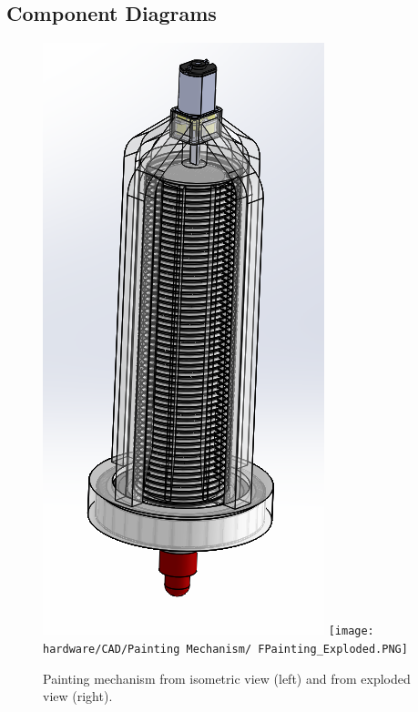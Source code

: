 \subsection{Component Diagrams}
\label{sec:component_diagrams}

\begin{figure}
\centering
\includegraphics[width=0.9\columnwidth]{hardware/CAD/Painting Mechanism/Painting.PNG}
\texttt{[image: hardware/CAD/Painting Mechanism/
FPainting\_Exploded.PNG]}
\caption{Painting mechanism from isometric view (left) and from exploded view (right).}
\label{fig:painting-diagram}
\end{figure}

